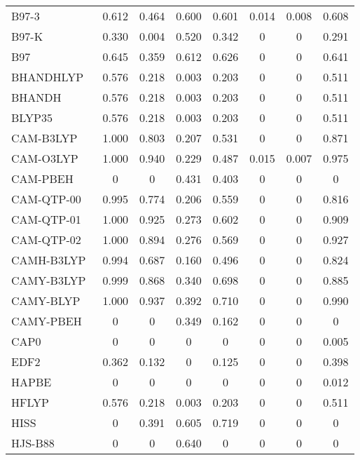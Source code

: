 \begin{table}
\begin{tabular}{|l|c|c|c|c|c|c|c|}
B97-3~\cite{Keal2005_121103} & 0.612 & 0.464 & 0.600 & 0.601 & 0.014 & 0.008 & 0.608 \\
B97-K~\cite{Boese2004_3405} & 0.330 & 0.004 & 0.520 & 0.342 & 0 & 0 & 0.291 \\
B97~\cite{Becke1997_8554} & 0.645 & 0.359 & 0.612 & 0.626 & 0 & 0 & 0.641 \\
BHANDHLYP~\cite{Becke1993_1372,gaussianimplementation} & 0.576 & 0.218 & 0.003 & 0.203 & 0 & 0 & 0.511 \\
BHANDH~\cite{Becke1993_1372,gaussianimplementation} & 0.576 & 0.218 & 0.003 & 0.203 & 0 & 0 & 0.511 \\
BLYP35~\cite{Renz2009_16292,Kaupp2011_16973} & 0.576 & 0.218 & 0.003 & 0.203 & 0 & 0 & 0.511 \\
CAM-B3LYP~\cite{Yanai2004_51} & 1.000 & 0.803 & 0.207 & 0.531 & 0 & 0 & 0.871 \\
CAM-O3LYP~\cite{Bircher2018_3184} & 1.000 & 0.940 & 0.229 & 0.487 & 0.015 & 0.007 & 0.975 \\
CAM-PBEH~\cite{Chen2018_073803} & 0 & 0 & 0.431 & 0.403 & 0 & 0 & 0 \\
CAM-QTP-00~\cite{Verma2014_18A534} & 0.995 & 0.774 & 0.206 & 0.559 & 0 & 0 & 0.816 \\
CAM-QTP-01~\cite{Jin2016_034107} & 1.000 & 0.925 & 0.273 & 0.602 & 0 & 0 & 0.909 \\
CAM-QTP-02~\cite{Haiduke2018_184106} & 1.000 & 0.894 & 0.276 & 0.569 & 0 & 0 & 0.927 \\
CAMH-B3LYP~\cite{Shao2020_587} & 0.994 & 0.687 & 0.160 & 0.496 & 0 & 0 & 0.824 \\
CAMY-B3LYP~\cite{Seth2012_901} & 0.999 & 0.868 & 0.340 & 0.698 & 0 & 0 & 0.885 \\
CAMY-BLYP~\cite{Akinaga2008_348} & 1.000 & 0.937 & 0.392 & 0.710 & 0 & 0 & 0.990 \\
CAMY-PBEH~\cite{Chen2018_073803} & 0 & 0 & 0.349 & 0.162 & 0 & 0 & 0 \\
CAP0~\cite{Carmona2016_120} & 0 & 0 & 0 & 0 & 0 & 0 & 0.005 \\
EDF2~\cite{Lin2004_365} & 0.362 & 0.132 & 0 & 0.125 & 0 & 0 & 0.398 \\
HAPBE~\cite{Fabiano2015_122} & 0 & 0 & 0 & 0 & 0 & 0 & 0.012 \\
HFLYP~\cite{Lee1988_785,Miehlich1989_200} & 0.576 & 0.218 & 0.003 & 0.203 & 0 & 0 & 0.511 \\
HISS~\cite{Henderson2007_221103} & 0 & 0.391 & 0.605 & 0.719 & 0 & 0 & 0 \\
HJS-B88~\cite{Henderson2008_194105} & 0 & 0 & 0.640 & 0 & 0 & 0 & 0 \\

\end{tabular}
\end{table}
